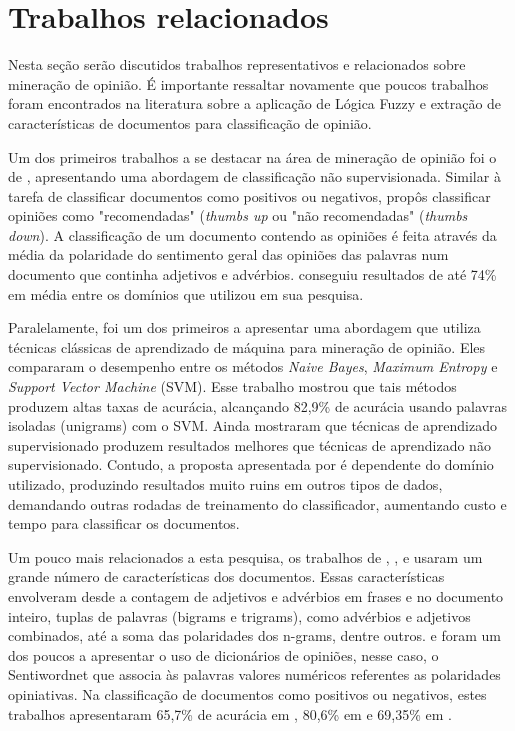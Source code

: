 \documentclass[template.tex]{subfiles}
\begin{document}
\section{Trabalhos relacionados}

Nesta seção serão discutidos trabalhos representativos e relacionados sobre mineração de opinião. É importante ressaltar novamente que poucos trabalhos foram encontrados na literatura sobre a aplicação de Lógica Fuzzy e extração de características de documentos para classificação de opinião. 

Um dos primeiros trabalhos a se destacar na área de mineração de opinião foi o de , apresentando uma abordagem de classificação não supervisionada. Similar à tarefa de classificar documentos como positivos ou negativos,  propôs classificar opiniões como "recomendadas" (\textit{thumbs up} ou "não recomendadas" (\textit{thumbs down}). A classificação de um documento contendo as opiniões é feita através da média da polaridade do sentimento geral das opiniões das palavras num documento que continha adjetivos e advérbios.  conseguiu resultados de até 74\% em média entre os domínios que utilizou em sua pesquisa.

Paralelamente,  foi um dos primeiros a apresentar uma abordagem que utiliza técnicas clássicas de aprendizado de máquina para mineração de opinião. Eles compararam o desempenho entre os métodos \textit{Naive Bayes}, \textit{Maximum Entropy} e \textit{Support Vector Machine} (SVM). Esse trabalho mostrou que tais métodos produzem altas taxas de acurácia, alcançando 82,9\% de acurácia usando palavras isoladas (unigrams) com o SVM. Ainda mostraram que técnicas de aprendizado supervisionado produzem resultados melhores que técnicas de aprendizado não supervisionado. Contudo, a proposta apresentada por  é dependente do domínio utilizado, produzindo resultados muito ruins em outros tipos de dados, demandando outras rodadas de treinamento do classificador, aumentando custo e tempo para classificar os documentos.

Um pouco mais relacionados a esta pesquisa, os trabalhos de , , e  usaram um grande número de características dos documentos. Essas características envolveram desde a contagem de adjetivos e advérbios em frases e no documento inteiro, tuplas de palavras (bigrams e trigrams), como advérbios e adjetivos combinados, até a soma das polaridades dos n-grams, dentre outros.  e  foram um dos poucos a apresentar o uso de dicionários de opiniões, nesse caso, o Sentiwordnet \cite{esuli2006sentiwordnet} que associa às palavras valores numéricos referentes as polaridades opiniativas. Na classificação de documentos como positivos ou negativos, estes trabalhos apresentaram 65,7\% de acurácia em , 80,6\% em  e 69,35\% em .
\end{document}
